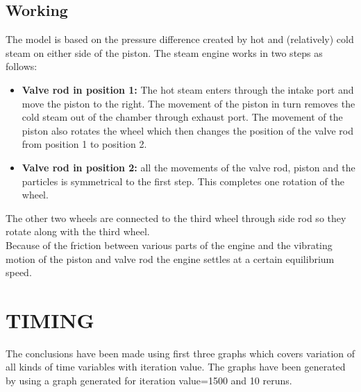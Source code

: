 \documentclass[11pt]{article}
\begin{document}
\subsection{Working}
The model is based on the pressure difference created by hot and (relatively) cold steam on either side of the piston. The steam engine works in two steps as follows:
\begin{itemize}
\item \textbf{Valve rod in position 1: } The hot steam enters through the intake port and move the piston to the right. The movement of the piston in turn removes the cold steam out of the chamber through exhaust port. The movement of the piston also rotates the wheel which then changes the position of the valve rod from position 1 to position 2.
\item \textbf{Valve rod in position 2: } all the movements of the valve rod, piston and the particles is symmetrical to the first step. This completes one rotation of the wheel.
\end{itemize}
The other two wheels are connected to the third wheel through side rod so they rotate along with the third wheel.\\
Because of the friction between various parts of the engine and the vibrating motion of the piston and valve rod the engine settles at a certain equilibrium speed.

\section{TIMING}
The conclusions have been made using first three graphs which covers variation of all kinds of time variables with iteration value.
The graphs have been generated by using a graph generated for iteration value=1500 and 10 reruns.
\end{document}
